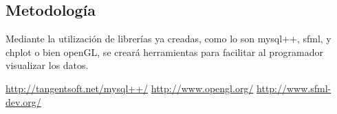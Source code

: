 \documentclass[11pt]{article}
\begin{document}
\subsection*{Metodología}
Mediante la utilización de librerías ya creadas, como lo son mysql++, sfml, y chplot o bien openGL, se creará herramientas para facilitar al programador visualizar los datos.
\begin{thebibliography}{10}
\url{http://tangentsoft.net/mysql++/}
\url{http://www.opengl.org/}
\url{http://www.sfml-dev.org/}
\end{thebibliography}
\end{document}
